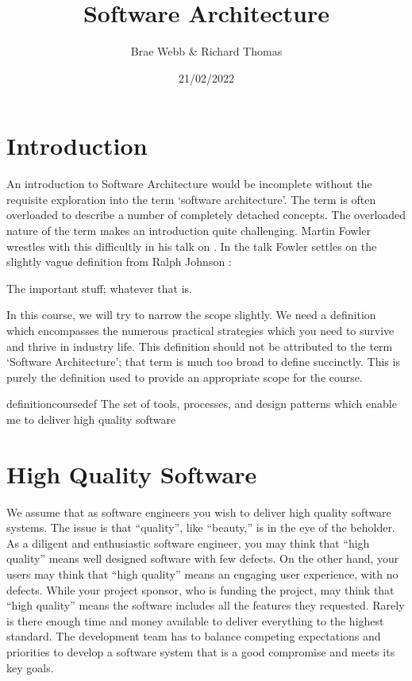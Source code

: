 \title{Software Architecture}
\author{Brae Webb \& Richard Thomas}
\date{21/02/2022}

\maketitle

\section{Introduction}
An introduction to Software Architecture would be incomplete without the requisite
exploration into the term `software architecture'.
The term is often overloaded to describe a number of completely detached concepts.
The overloaded nature of the term makes an introduction quite challenging.
Martin Fowler wrestles with this difficultly in his talk on .
In the talk Fowler settles on the slightly vague definition from Ralph Johnson \cite{fowler-what-is-architecture}:

\begin{definition}
The important stuff; whatever that is.
\end{definition}

In this course, we will try to narrow the scope slightly.
We need a definition which encompasses the numerous practical strategies which you need to survive and thrive in industry life.
This definition should not be attributed to the term `Software Architecture'; that term is much too broad to define succinctly.
This is purely the definition used to provide an appropriate scope for the course.

\begin{restatable}{definition}{coursedef}
The set of tools, processes, and design patterns which enable me to deliver high quality software
\end{restatable}

\section{High Quality Software}
We assume that as software engineers you wish to deliver high quality software systems.
The issue is that ``quality'', like ``beauty,'' is in the eye of the beholder.
As a diligent and enthusiastic software engineer, you may think that ``high quality'' means well designed software with few defects.
On the other hand, your users may think that ``high quality'' means an engaging user experience, with no defects.
While your project sponsor, who is funding the project, may think that ``high quality'' means the software includes all the features they requested.
Rarely is there enough time and money available to deliver everything to the highest standard.
The development team has to balance competing expectations and priorities to develop a software system that is a good compromise and meets its key goals.

